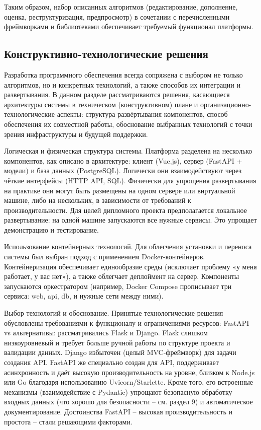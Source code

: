 Таким образом, набор описанных алгоритмов (редактирование, дополнение, оценка, реструктуризация, предпросмотр) в сочетании с перечисленными фреймворками и библиотеками обеспечивает требуемый функционал платформы.

\subsection{Конструктивно-технологические решения}
Разработка программного обеспечения всегда сопряжена с выбором не только алгоритмов, но и конкретных технологий, а также способов их интеграции и развертывания. В данном разделе рассматриваются решения, касающиеся архитектуры системы в техническом (конструктивном) плане и организационно-технологические аспекты: структура развёртывания компонентов, способ обеспечения их совместной работы, обоснование выбранных технологий с точки зрения инфраструктуры и будущей поддержки.

\par Логическая и физическая структура системы. Платформа разделена на несколько компонентов, как описано в архитектуре: клиент (Vue.js), сервер (FastAPI + модели) и база данных (PostgreSQL). Логически они взаимодействуют через чёткие интерфейсы (HTTP API, SQL). Физически для упрощения развертывания на практике они могут быть размещены на одном сервере или виртуальной машине, либо на нескольких, в зависимости от требований к производительности.
Для целей дипломного проекта предполагается локальное развертывание: на одной машине запускаются все нужные сервисы. Это упрощает демонстрацию и тестирование.

Использование контейнерных технологий. Для облегчения установки и переноса системы был выбран подход с применением Docker-контейнеров.
Контейнеризация обеспечивает единообразие среды (исключает проблему «у меня работает, у вас нет»), а также облегчает деплоймент на сервер. Компоненты запускаются оркестратором (например, Docker Compose прописывает три сервиса: web, api, db, и нужные сети между ними).

Выбор технологий и обоснование. Принятые технологические решения обусловлены требованиями к функционалу и ограничениями ресурсов:
FastAPI vs альтернативы: рассматривались Flask и Django. Flask слишком низкоуровневый и требует больше ручной работы по структуре проекта и валидации данных. Django избыточен (целый MVC-фреймворк) для задачи создания API. FastAPI же специально создан для API, поддерживает асинхронность и даёт высокую производительность на уровне, близком к Node.js или Go благодаря использованию Uvicorn/Starlette\cite{easyoffer:fastapi}. Кроме того, его встроенные механизмы (взаимодействие с Pydantic) упрощают безопасную обработку входных данных (что хорошо для безопасности – см. раздел 9) и автоматическое документирование. Достоинства FastAPI – высокая производительность и простота – стали решающими факторами\cite{fastapi:practicum}.

